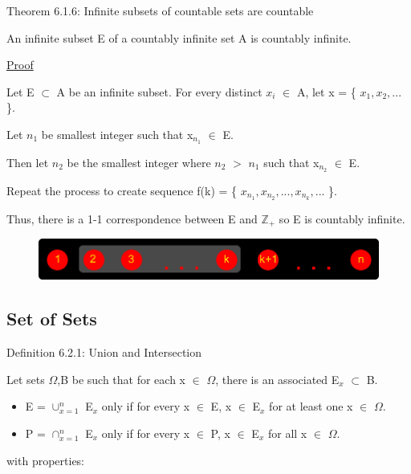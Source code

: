 { \color{red} Theorem 6.1.6: Infinite subsets of countable sets are countable } 

	\qquad An infinite subset E of a countably infinite set A is countably infinite.

{ \color{magenta} \underline{Proof} } 

	Let E $\subset$ A be an infinite subset.
	For every distinct $x_i$ $\in$ A, let x = \{ $x_1, x_2, ...$ \}.

	Let $n_1$ be smallest integer such that x$_{n_1}$ $\in$ E.

	Then let $n_2$ be the smallest integer where $n_2$ $>$ $n_1$ such that x$_{n_2}$ $\in$ E.

	Repeat the process to create sequence f(k) = \{ $x_{n_1}, x_{n_2}, ... , x_{n_k} , ...$ \}.

	Thus, there is a 1-1 correspondence between E and $\mathbb{Z}_+$ so
	E is countably infinite.

\begin{figure}[h]
	\centering
	\includegraphics[scale=0.5]{Images/6.1.6.png}
\end{figure}





\subsection{ Set of Sets } 

{ \color{blue} Definition 6.2.1: Union and Intersection } 

	\begin{adjustbox}{minipage=14cm, right, vspace=0.1cm 0cm}
		Let sets $\Omega$,B be such that for each x $\in$ $\Omega$,
		there is an associated E$_x$ $\subset$ B.
		\begin{itemize}[leftmargin=1cm, itemsep=0.1cm]
			\item E = $\cup_{x=1}^{n}$ E$_x$ only if for every x $\in$ E, x $\in$ E$_x$ for
				at least one x $\in$ $\Omega$.

			\item P = $\cap_{x=1}^{n}$ E$_x$ only if for every x $\in$ P, x $\in$ E$_x$ for
				all x $\in$ $\Omega$.
		\end{itemize}
		with properties:
	\end{adjustbox}

